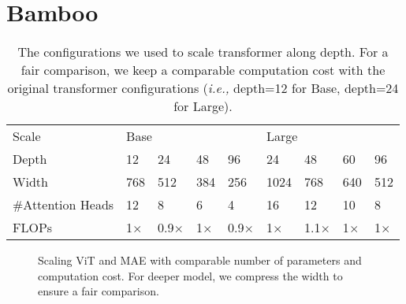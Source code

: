 \documentclass{article}
\theoremstyle{plain}
\theoremstyle{definition}
\theoremstyle{remark}
\newcommand{\ie}{\emph{i.e.,}\xspace}
\begin{document}
\section{Bamboo}\label{Bamboo}





\begin{table*}[t]
\caption{The configurations we used to scale transformer along depth. For a fair comparison, we keep a comparable computation cost with the original transformer configurations (\ie depth=12 for Base, depth=24 for Large).}
\centering
\small
\begin{tabular}{l llll llll}
\toprule 
Scale                  & \multicolumn{4}{l}{Base} & \multicolumn{4}{l}{Large} \\  \cmidrule(lr){2-5}\cmidrule(lr){6-9}
Depth             & 12   & 24   & 48   & 96  & 24    & 48   & 60   & 96  \\ 
Width             & 768  & 512  & 384  & 256 & 1024  & 768  & 640  & 512 \\
\#Attention Heads & 12   & 8    & 6    & 4   & 16    & 12   & 10   & 8   \\
FLOPs  & 1$\times$    & 0.9$\times$  & 1$\times$    & 0.9$\times$ & 1$\times$    & 1.1$\times$  & 1$\times$    & 1$\times$  \\ \bottomrule
\end{tabular}
\vspace{-0.4cm}
\label{tbl:config-explore}
\end{table*}




\begin{figure}[t]
\centering
{}\vspace{-0.35cm}

\vspace{-0.35cm}
\caption{Scaling ViT and MAE with comparable number of parameters and computation cost. For deeper model, we compress the width to ensure a fair comparison.}
\label{fig:sweet}
\vspace{-0.4cm}
\end{figure}
\end{document}
